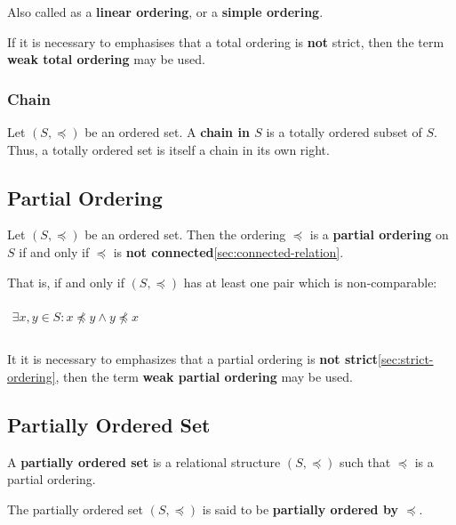 Also called as a \textbf{linear ordering}, or a \textbf{simple
  ordering}.

If it is necessary to emphasises that a total ordering is \textbf{not}
strict, then the term \textbf{weak total ordering} may be used.

\subsubsection{Chain}
\label{sec:chain}

Let $(S, \preceq)$ be an ordered set. A \textbf{chain in $S$} is a
totally ordered subset of $S$. Thus, a totally ordered set is itself a
chain in its own right.


\subsection{Partial Ordering}
\label{sec:partial-ordering}

Let $(S, \preceq)$ be an ordered set. Then the ordering $\preceq$ is a
\textbf{partial ordering} on $S$ if and only if $\preceq$ is
\textbf{not connected}\ref{sec:connected-relation}.

That is, if and only if $(S, \preceq)$ has at least one pair which is
non-comparable:

\begin{math}
  \begin{array}{c}
    \\
    \exists x, y \in S : x \npreceq y \land y \npreceq x \\
    \\
  \end{array}
\end{math}


It it is necessary to emphasizes that a partial ordering is
\textbf{not strict}\ref{sec:strict-ordering}, then the term
\textbf{weak partial ordering} may be used.


\subsection{Partially Ordered Set}
\label{sec:poset}

A \textbf{partially ordered set} is a relational structure
$(S, \preceq)$ such that $\preceq$ is a partial ordering.

The partially ordered set $(S, \preceq)$ is said to be
\textbf{partially ordered by $\preceq$}.



